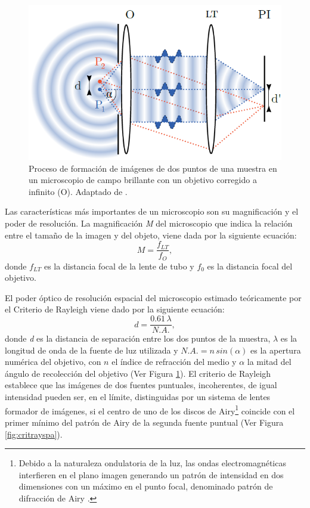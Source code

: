 \begin{figure}[H]
	\centering
	\includegraphics[width=1.0\textwidth]{Figs/introduccion/martinbordenave.png}
	\caption{Proceso de formación de imágenes de dos puntos de una muestra en un microscopio de campo brillante con un objetivo corregido a infinito (O). Adaptado de \cite{borden}.}
	\label{fig:mdb}
\end{figure}

Las características más importantes de un microscopio son su magnificación y el poder de resolución. La magnificación \textit{M} del microscopio que indica la relación entre el tamaño de la imagen y del objeto, viene dada por la siguiente ecuación:
\begin{equation}
M = \frac{f_{LT}}{f_{O}},
\end{equation}	
donde $f_{LT}$ es la distancia focal de la lente de tubo y $f_{0}$ es la distancia focal del objetivo.

El poder óptico de resolución espacial del microscopio estimado teóricamente por el Criterio de Rayleigh viene dado por la siguiente ecuación:
\begin{equation}
d = \frac{0.61 \hspace{2pt} \lambda}{ N.A.},
\end{equation}
donde \textit{d} es la distancia de separación entre los dos puntos de la muestra, $\lambda$ es la longitud de onda de la fuente de luz utilizada y $N.A. = n \hspace{2pt} sin(\alpha)$ es la apertura numérica del objetivo, con $n$ el índice de refracción del medio y $\alpha$ la mitad del ángulo de recolección del objetivo (Ver Figura \ref{fig:mdb}). El criterio de Rayleigh establece que las imágenes de dos fuentes puntuales, incoherentes, de igual intensidad pueden ser, en el límite, distinguidas por un sistema de lentes formador de imágenes, si el centro de uno de los discos de Airy\footnote{Debido a la naturaleza ondulatoria de la luz, las ondas
electromagnéticas interfieren en el plano imagen generando un patrón de intensidad en dos dimensiones con
un máximo en el punto focal, denominado patrón de difracción de Airy \cite{hecht2012optics}.} coincide con el primer mínimo del patrón de Airy de la segunda fuente puntual (Ver Figura \ref{fig:critrayspa}).

